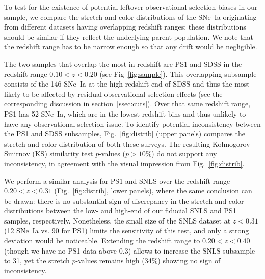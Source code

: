 \documentclass[]{aa}
\begin{document}
To test for the existence of potential leftover observational selection biases
in our sample, we compare the stretch and color distributions of the SNe~Ia
originating from different datasets having overlapping redshift ranges: these
distributions should be similar if they reflect the underlying parent
population. We note that the redshift range has to be narrow enough so that any
drift would be negligible.

The two samples that overlap the most in redshift are PS1 and SDSS in the
redshift range $0.10 < z < 0.20$ (see Fig~\ref{fig:sample}). This overlapping
subsample consists of the 146 SNe~Ia at the high-redshift end of SDSS and thus
the most likely to be affected by residual observational selection effects (see
the corresponding discussion in section~\ref{ssec:cuts}). Over that same
redshift range, PS1 has 52 SNe~Ia, which are in the lowest redshift bins and
thus unlikely to have any observational selection issue. To identify potential
inconsistency between the PS1 and SDSS subsamples, Fig.~\ref{fig:distrib} (upper
panels) compares the stretch and color distribution of both these surveys. The
resulting Kolmogorov-Smirnov (KS) similarity test $p$-values ($p >10\%$) do not
support any inconsistency, in agreement with the visual impression from
Fig.~\ref{fig:distrib}.

We perform a similar analysis for PS1 and SNLS over the redshift range $0.20 < z
< 0.31$ (Fig.~\ref{fig:distrib}, lower panels), where the same conclusion can be
drawn: there is no substantial sign of discrepancy in the stretch and color
distributions between the low- and high-end of our fiducial SNLS and PS1
samples, respectively. Nonetheless, the small size of the SNLS dataset at $z <
0.31$ (12 SNe~Ia vs. 90 for PS1) limits the sensitivity of this test, and only a
strong deviation would be noticeable. Extending the redshift range to $0.20 < z
< 0.40$ (though we have no PS1 data above 0.3) allows to increase the SNLS
subsample to 31, yet the stretch $p$-values remains high (34\%) showing no sign
of inconsistency.
\end{document}

